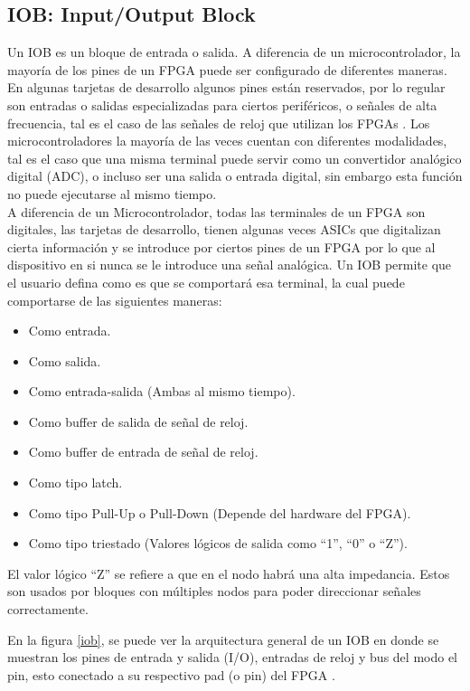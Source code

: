 \documentclass[twoside,spanish,ESP,MSc]{plantillaLabUPV}
\theoremstyle{definition}
\newcommand{\f}{FPGA }
\newcommand{\fs}{FPGAs }
\begin{document}
\subsection*{IOB: Input/Output Block}

Un IOB es un bloque de entrada o salida. A diferencia de un microcontrolador, la mayoría de los pines de un \f puede ser configurado de diferentes maneras. En algunas tarjetas de desarrollo algunos pines están reservados, por lo regular son entradas o salidas especializadas para ciertos periféricos, o señales de alta frecuencia, tal es el caso de las señales de reloj que utilizan los \fs. Los microcontroladores la mayoría de las veces cuentan con diferentes modalidades, tal es el caso que una misma terminal puede servir como un convertidor analógico digital (ADC), o incluso ser una salida o entrada digital, sin embargo esta función no puede ejecutarse al mismo tiempo.\\

A diferencia de un Microcontrolador, todas las terminales de un FPGA son digitales, las tarjetas de desarrollo, tienen algunas veces ASICs que digitalizan cierta información y se introduce por ciertos pines de un \f por lo que al dispositivo en si nunca se le introduce una señal analógica. Un IOB permite que el usuario defina como es que se comportará esa terminal, la cual puede comportarse de las siguientes maneras:

\begin{itemize}
\item Como entrada.
\item Como salida.
\item Como entrada-salida (Ambas al mismo tiempo).
\item Como buffer de salida de señal de reloj.
\item Como buffer de entrada de señal de reloj.
\item Como tipo latch.
\item Como tipo Pull-Up o Pull-Down (Depende del hardware del FPGA).
\item Como tipo triestado (Valores lógicos de salida como ``1'', ``0'' o ``Z'').\\
\end{itemize}

El valor lógico ``Z'' se refiere a que en el nodo habrá una alta impedancia. Estos son usados por bloques con múltiples nodos para poder direccionar señales correctamente.

En la figura \ref{iob}, se puede ver la arquitectura general de un IOB en donde se muestran los pines de entrada y salida (I/O), entradas de reloj y bus del modo el pin, esto conectado a su respectivo pad (o pin) del \f.
\end{document}
